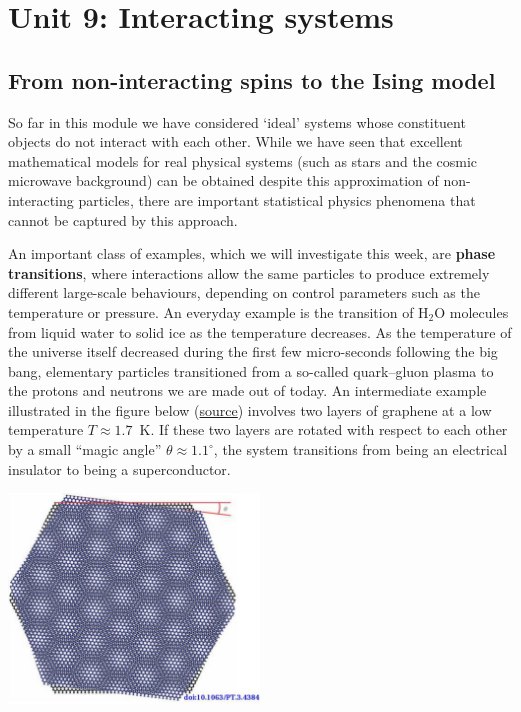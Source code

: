 \renewcommand{\thisunit}{MATH327 Unit 9}
\renewcommand{\moddate}{Last modified 19 Mar.~2022}
\setcounter{section}{9}
\setcounter{subsection}{0}
{}
\section*{Unit 9: Interacting systems}
\subsection{\label{sec:Ising}From non-interacting spins to the Ising model}
So far in this module we have considered `ideal' systems whose constituent objects do not interact with each other.
While we have seen that excellent mathematical models for real physical systems (such as stars and the cosmic microwave background) can be obtained despite this approximation of non-interacting particles, there are important statistical physics phenomena that cannot be captured by this approach.

An important class of examples, which we will investigate this week, are \textbf{phase transitions}, where interactions allow the same particles to produce extremely different large-scale behaviours, depending on control parameters such as the temperature or pressure.
An everyday example is the transition of H$_2$O molecules from liquid water to solid ice as the temperature decreases.
As the temperature of the universe itself decreased during the first few micro-seconds following the big bang, elementary particles transitioned from a so-called quark--gluon plasma to the protons and neutrons we are made out of today.
An intermediate example illustrated in the figure below (\href{https://doi.org/10.1063/PT.3.4384}{source}) involves two layers of graphene at a low temperature $T \approx 1.7$~K.
If these two layers are rotated with respect to each other by a small ``magic angle'' $\theta \approx 1.1^{\circ}$, the system transitions from being an electrical insulator to being a superconductor.

\begin{center}\includegraphics[width=0.5\textwidth]{figs/unit09_graphene.pdf}\end{center}

